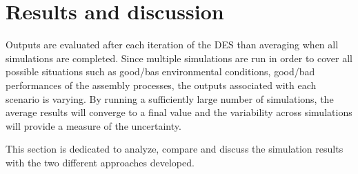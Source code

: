 \section{Results and discussion}
\label{results}
Outputs are evaluated after each iteration of the DES than averaging when all simulations are completed. Since multiple simulations are run in order to cover all possible situations such as good/bas environmental conditions, good/bad performances of the assembly processes, the outputs associated with each scenario is varying. By running a sufficiently large number of simulations, the average results will converge to a final value and the variability across simulations will provide a measure of the uncertainty.

This section is dedicated to analyze, compare and discuss the simulation results with the two different approaches developed.